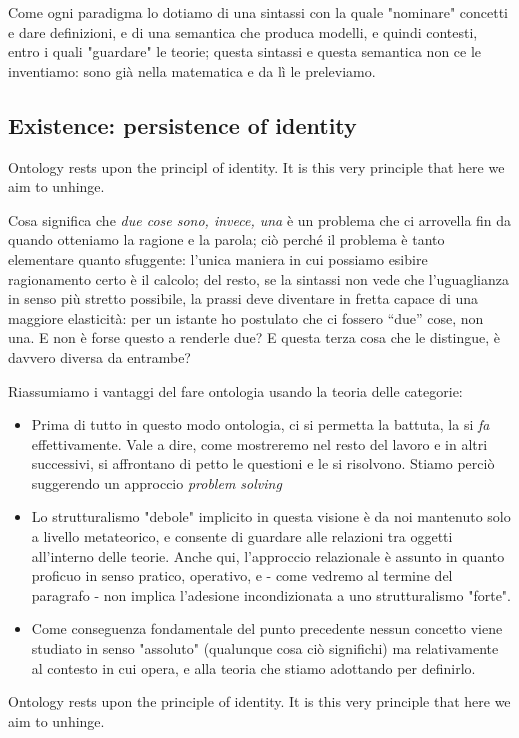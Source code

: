 Come ogni paradigma lo dotiamo di una sintassi con la quale "nominare" concetti e dare definizioni, e di una semantica che produca modelli, e quindi contesti, entro i quali "guardare" le teorie; questa sintassi e questa semantica non ce le inventiamo: sono già nella matematica e da lì le preleviamo.
\subsection{Existence: persistence of identity}
Ontology rests upon the principl of identity. It is this very principle that here we aim to unhinge.

Cosa significa che \emph{due cose sono, invece, una} è un problema che ci arrovella fin da quando otteniamo la ragione e la parola; ciò perché il problema è tanto elementare quanto sfuggente: l'unica maniera in cui possiamo esibire ragionamento certo è il calcolo; del resto, se la sintassi non vede che l'uguaglianza in senso più stretto possibile, la prassi deve diventare in fretta capace di una maggiore elasticità: per un istante ho postulato che ci fossero ``due'' cose, non una. E non è forse questo a renderle due? E questa terza cosa che le distingue, è davvero diversa da entrambe?

Riassumiamo i vantaggi del fare ontologia usando la teoria delle categorie:
	\begin{itemize}
		\item Prima di tutto in questo modo ontologia, ci si permetta la battuta, la si \emph{fa} effettivamente. Vale a dire, come mostreremo nel resto del lavoro e in altri successivi, si affrontano di petto le questioni e le si risolvono. Stiamo perciò suggerendo un approccio \emph{problem solving}
		\item Lo strutturalismo "debole" implicito in questa visione è da noi mantenuto solo a livello metateorico, e consente di guardare alle relazioni tra oggetti all'interno delle teorie. Anche qui, l'approccio relazionale è assunto in quanto proficuo in senso pratico, operativo, e - come vedremo al termine del paragrafo - non implica l'adesione incondizionata a uno strutturalismo "forte".
		\item Come conseguenza fondamentale del punto precedente nessun concetto viene studiato in senso "assoluto" (qualunque cosa ciò significhi) ma relativamente al contesto in cui opera, e alla teoria che stiamo adottando per definirlo.  
	\end{itemize}
	Ontology rests upon the principle of identity. It is this very principle that here we aim to unhinge.
	
